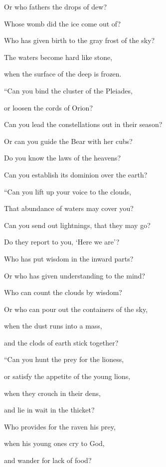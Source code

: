 {\par }{\QB Or who fathers the drops of dew?
\par }{\Q {}Whose womb did the ice come out of?
\par }{\QB Who has given birth to the gray frost of the sky?
\par }{\Q {}The waters become hard like stone,
\par }{\QB when the surface of the deep is frozen.
\par }{\BB \par }{\Q {}“Can you bind the cluster of the Pleiades,
\par }{\QB or loosen the cords of Orion?
\par }{\Q {}Can you lead the constellations out in their season?
\par }{\QB Or can you guide the Bear with her cubs?
\par }{\Q {}Do you know the laws of the heavens?
\par }{\QB Can you establish its dominion over the earth?
\par }{\BB \par }{\Q {}“Can you lift up your voice to the clouds,
\par }{\QB That abundance of waters may cover you?
\par }{\Q {}Can you send out lightnings, that they may go?
\par }{\QB Do they report to you, ‘Here we are’?
\par }{\Q {}Who has put wisdom in the inward parts?
\par }{\QB Or who has given understanding to the mind?
\par }{\Q {}Who can count the clouds by wisdom?
\par }{\QB Or who can pour out the containers of the sky,
\par }{\Q {}when the dust runs into a mass,
\par }{\QB and the clods of earth stick together?
\par }{\BB \par }{\Q {}“Can you hunt the prey for the lioness,
\par }{\QB or satisfy the appetite of the young lions,
\par }{\Q {}when they crouch in their dens,
\par }{\QB and lie in wait in the thicket?
\par }{\Q {}Who provides for the raven his prey,
\par }{\QB when his young ones cry to God,
\par }{\QB and wander for lack of food?
\par }{\BB \par }
